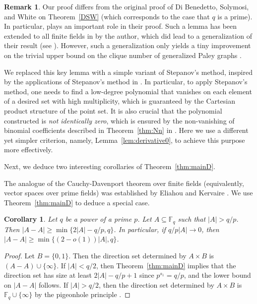 \documentclass[12pt,reqno]{amsart}
\newtheorem{cor}[thm]{Corollary}
\theoremstyle{definition}
\newtheorem{rem}[thm]{Remark}
\newcommand{\F}{\mathbb{F}}
\begin{document}
\begin{rem}\label{rem:Stepanov}
Our proof differs from the original proof of Di Benedetto,  Solymosi, and White \cite{DSW} on Theorem~\ref{DSW} (which corresponds to the case that $q$ is a prime). In particular, \cite[Lemma 6]{DSW} plays an important role in their proof. Such a lemma has been extended to all finite fields in \cite[Lemma 3.1]{Yip2} by the author, which did lead to a generalization of their result (see \cite[Theorem 1.6]{Yip2}). However, such a generalization only yields a tiny improvement on the trivial upper bound on the clique number of generalized Paley graphs \cite[Theorem 1.9]{Yip2}.

We replaced this key lemma with a simple variant of Stepanov's method, inspired by the applications of Stepanov's method in \cite{Yip2, Yip1}. In particular, to apply Stepanov's method, one needs to find a low-degree polynomial that vanishes on each element of a desired set with high multiplicity, which is guaranteed by the Cartesian product structure of the point set. It is also crucial that the polynomial constructed is \emph{not identically zero}, which is ensured by the non-vanishing of binomial coefficients described in Theorem~\ref{thm:Nn} in \cite{Yip2, Yip1}. Here we use a different yet simpler criterion, namely, Lemma~\ref{lem:derivative0}, to achieve this purpose more effectively. 
\end{rem}
    
Next, we deduce two interesting corollaries of Theorem~\ref{thm:mainD}. 

The analogue of the Cauchy-Davenport theorem over finite fields (equivalently, vector spaces over prime fields) was established by Eliahou and Kervaire \cite{EK98}. We use Theorem~\ref{thm:mainD} to deduce a special case. 

\begin{cor}\label{cor:CD}
Let $q$ be a power of a prime $p$. Let $A \subseteq \F_q$ such that $|A|>q/p$. Then $|A-A|\geq \min \{2|A|-q/p, q\}$. In particular, if $q/p|A| \to 0$, then $|A-A|\geq \min \{(2-o(1))|A|, q\}$.
\end{cor}
\begin{proof}
Let $B=\{0,1\}$. Then the direction set determined by $A \times B$ is $(A-A) \cup \{\infty\}$. If $|A|<q/2$, then Theorem~\ref{thm:mainD} implies that the direction set has size at least $2|A|-q/p+1$ since $p^{s_1}=q/p$, and the lower bound on $|A-A|$ follows. If $|A|>q/2$, then the direction set determined by $A \times B$ is $\F_q \cup \{\infty\}$ by the pigeonhole principle \cite[Lemma 2.1]{D21}. 
\end{proof}
\end{document}
